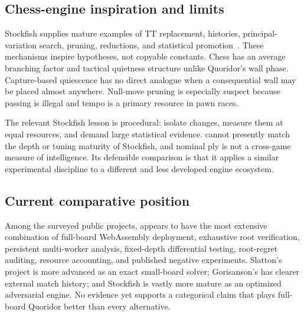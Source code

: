 \subsection{Chess-engine inspiration and limits}
Stockfish supplies mature examples of TT replacement, histories, principal-variation search, pruning, reductions, and statistical promotion~\cite{stockfishSearch,stockfishTT,fishtest}. These mechanisms inspire hypotheses, not copyable constants. Chess has an average branching factor and tactical quietness structure unlike Quoridor's wall phase. Capture-based quiescence has no direct analogue when a consequential wall may be placed almost anywhere. Null-move pruning is especially suspect because passing is illegal and tempo is a primary resource in pawn races.

The relevant Stockfish lesson is procedural: isolate changes, measure them at equal resources, and demand large statistical evidence. \walwuk{} cannot presently match the depth or tuning maturity of Stockfish, and nominal ply is not a cross-game measure of intelligence. Its defensible comparison is that it applies a similar experimental discipline to a different and less developed engine ecosystem.

\subsection{Current comparative position}
Among the surveyed public projects, \walwuk{} appears to have the most extensive combination of full-board WebAssembly deployment, exhaustive root verification, persistent multi-worker analysis, fixed-depth differential testing, root-regret auditing, resource accounting, and published negative experiments. Slatton's project is more advanced as an exact small-board solver; Gorisanson's has clearer external match history; and Stockfish is vastly more mature as an optimized adversarial engine. No evidence yet supports a categorical claim that \walwuk{} plays full-board Quoridor better than every alternative.
